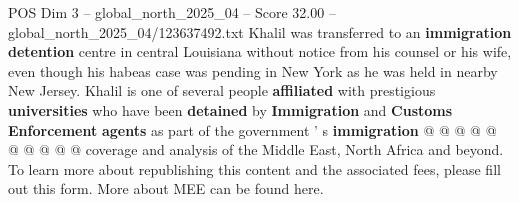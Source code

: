 \begin{textsample}{POS Dim 3 – global\_north\_2025\_04 – Score 32.00 – global\_north\_2025\_04/123637492.txt}
Khalil was transferred to an \textbf{immigration} \textbf{detention} centre in central Louisiana without notice from his counsel or his wife, even though his habeas case was pending in New York as he was held in nearby New Jersey.
Khalil is one of several people \textbf{affiliated} with prestigious \textbf{universities} who have been \textbf{detained} by \textbf{Immigration} and \textbf{Customs} \textbf{Enforcement} \textbf{agents} as part of the government ' s \textbf{immigration} @ @ @ @ @ @ @ @ @ @ coverage and analysis of the Middle East, North Africa and beyond.
To learn more about republishing this content and the associated fees, please fill out this form.
More about MEE can be found here.

\end{textsample}
